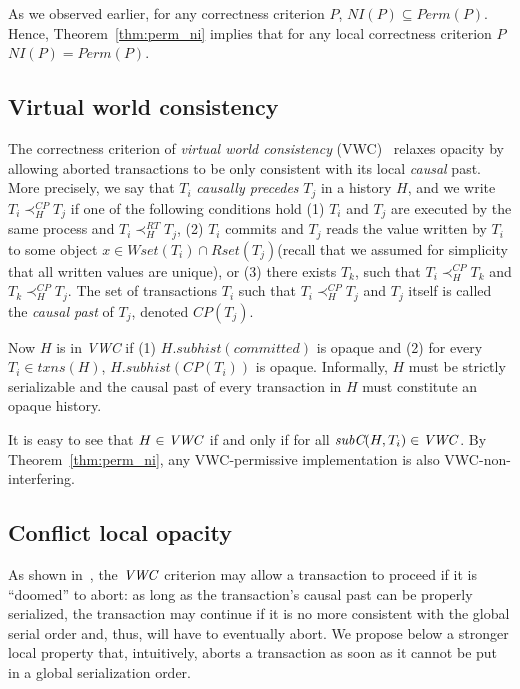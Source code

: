 \documentclass{llncs}
\newcommand{\thmref}[1]{Theorem~\ref{thm:#1}}
\newcommand{\Wset}{\textit{Wset}}
\newcommand{\Rset}{\textit{Rset}}
\newcommand{\id}[1]{\mbox{\textit{#1}}}\newcommand{\res}[1]{\mbox{\textbf{#1}}}
\newcommand{\comm}{\textit{committed}}
\newcommand{\txns}{\textit{txns}}
\newcommand{\permfn}[1] {\textit{Perm}(#1)}
\newcommand{\nifn}[1] {\textit{NI}(#1)}
\newcommand{\subs}[2]  {\textit{subC}(#2,#1)}
\newcommand{\shist}[2]  {#2.subhist(#1)}
\begin{document}
\noindent
As we observed earlier, for any correctness criterion $P$, $\nifn{P} \subseteq \permfn{P}$. Hence, \thmref{perm_ni} implies that for any local correctness
criterion $P$ $\nifn{P} = \permfn{P}$. 


\subsection{Virtual world consistency}
\label{subsec:vwc}

The correctness criterion of \emph{virtual world
  consistency} (VWC)~\cite{ImbsRay:2009:SIROCCO} relaxes opacity by
 allowing aborted transactions to be only consistent with its local
 \emph{causal} past.
More precisely, we say that $T_i$ \emph{causally precedes} $T_j$ in a history
$H$, and we write $T_i\prec_H^{CP} T_j$  if one of the following
conditions hold (1) $T_i$ and $T_j$ are executed by the same process
and   $T_i\prec_H^{RT}T_j$, (2) $T_i$ commits and $T_j$  reads the
value written by $T_i$ to some object $x\in\Wset(T_i)\cap\Rset(T_j)$(recall that we assumed for simplicity that all
written values are unique),   or (3) there exists $T_k$, such that
$T_i\prec_H^{CP} T_k$  and $T_k\prec_H^{CP} T_j$.  
The set of  transactions $T_i$ such that
$T_i\prec_H^{CP}T_j$ and $T_j$ itself is called the \emph{causal past} of
$T_j$, denoted $CP(T_j)$.    

Now $H$ is in \id{VWC} if (1) $\shist{\comm}{H}$ is opaque
and (2) for every $T_i\in\txns(H)$,  $\shist{CP(T_i)}{H}$ is opaque. 
Informally, $H$ must be strictly serializable and the causal past 
of every transaction in $H$ must
constitute an opaque history. 

It is easy to see that $H\in\id{VWC}$ if and only if for all
$\subs{T_i}{H}\in\id{VWC}$. 
By \thmref{perm_ni}, any VWC-permissive implementation is
also VWC-non-interfering.  

\subsection{Conflict local opacity}
\label{subsec:clo}

As shown in~\cite{ImbsRay:2009:SIROCCO}, the $\id{VWC}$ criterion may allow a transaction to proceed if it is ``doomed'' to abort: as long as the transaction's causal past can be properly serialized, the transaction may continue if it is no more consistent with the global serial order and, thus, will have to eventually abort. We propose below a stronger local property that, intuitively, aborts a transaction as soon as it cannot be put in a global serialization order. 
\end{document}
